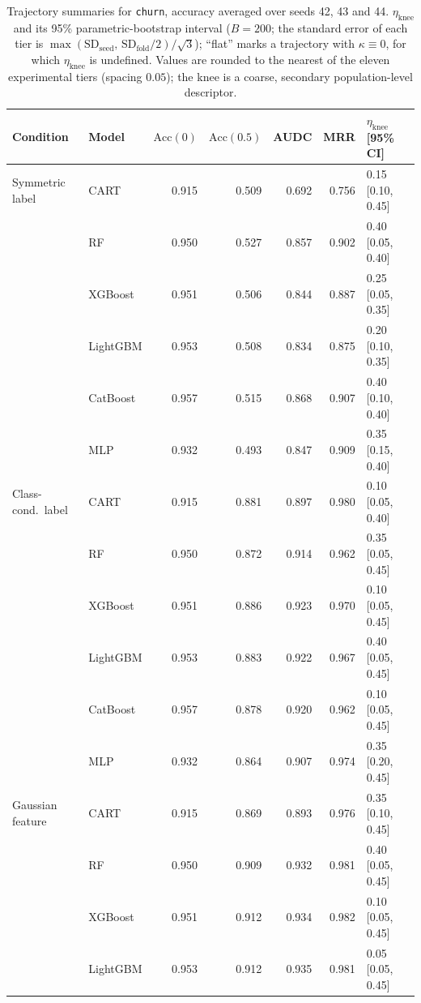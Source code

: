 \begin{table}[p]
\centering
\scriptsize
\setlength{\tabcolsep}{3.5pt}
\caption{Trajectory summaries for \texttt{churn}, accuracy averaged over seeds 42, 43 and 44. $\eta_{\mathrm{knee}}$ and its 95\% parametric-bootstrap interval ($B=200$; the standard error of each tier is $\max(\mathrm{SD}_{\mathrm{seed}},\,\mathrm{SD}_{\mathrm{fold}}/2)/\sqrt3$); ``flat'' marks a trajectory with $\kappa\equiv 0$, for which $\eta_{\mathrm{knee}}$ is undefined. Values are rounded to the nearest of the eleven experimental tiers (spacing $0.05$); the knee is a coarse, secondary population-level descriptor.}
\label{tab:traj_churn}
\begin{tabular}{@{}llrrrrl@{}}
\toprule
Condition & Model & $\mathrm{Acc}(0)$ & $\mathrm{Acc}(0.5)$ & AUDC & MRR & $\eta_{\mathrm{knee}}$ [95\% CI] \\
\midrule
Symmetric label & CART & 0.915 & 0.509 & 0.692 & 0.756 & 0.15 [0.10, 0.45] \\
 & RF & 0.950 & 0.527 & 0.857 & 0.902 & 0.40 [0.05, 0.40] \\
 & XGBoost & 0.951 & 0.506 & 0.844 & 0.887 & 0.25 [0.05, 0.35] \\
 & LightGBM & 0.953 & 0.508 & 0.834 & 0.875 & 0.20 [0.10, 0.35] \\
 & CatBoost & 0.957 & 0.515 & 0.868 & 0.907 & 0.40 [0.10, 0.40] \\
 & MLP & 0.932 & 0.493 & 0.847 & 0.909 & 0.35 [0.15, 0.40] \\
\midrule
Class-cond.\ label & CART & 0.915 & 0.881 & 0.897 & 0.980 & 0.10 [0.05, 0.40] \\
 & RF & 0.950 & 0.872 & 0.914 & 0.962 & 0.35 [0.05, 0.45] \\
 & XGBoost & 0.951 & 0.886 & 0.923 & 0.970 & 0.10 [0.05, 0.45] \\
 & LightGBM & 0.953 & 0.883 & 0.922 & 0.967 & 0.40 [0.05, 0.45] \\
 & CatBoost & 0.957 & 0.878 & 0.920 & 0.962 & 0.10 [0.05, 0.45] \\
 & MLP & 0.932 & 0.864 & 0.907 & 0.974 & 0.35 [0.20, 0.45] \\
\midrule
Gaussian feature & CART & 0.915 & 0.869 & 0.893 & 0.976 & 0.35 [0.10, 0.45] \\
 & RF & 0.950 & 0.909 & 0.932 & 0.981 & 0.40 [0.05, 0.45] \\
 & XGBoost & 0.951 & 0.912 & 0.934 & 0.982 & 0.10 [0.05, 0.45] \\
 & LightGBM & 0.953 & 0.912 & 0.935 & 0.981 & 0.05 [0.05, 0.45] \\

\end{tabular}
\end{table}
